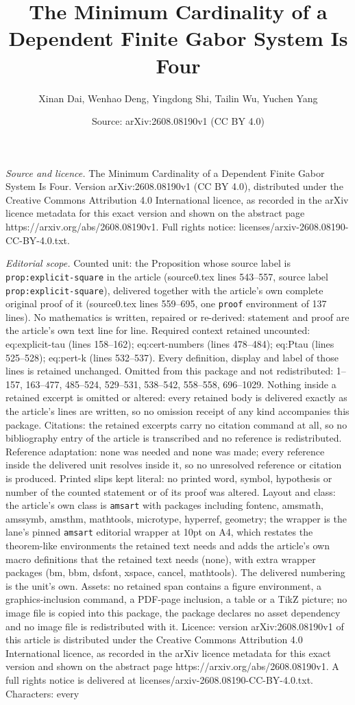 \documentclass[10pt,a4paper]{amsart}
\title[The Minimum Cardinality of a Dependent Finite Gabor System I]{The Minimum Cardinality of a Dependent Finite Gabor System Is Four}
\author{Xinan Dai, Wenhao Deng, Yingdong Shi, Tailin Wu, Yuchen Yang}
\date{Source: arXiv:2608.08190v1 (CC BY 4.0)}
\begin{document}
\maketitle

\noindent\emph{Source and licence.} The Minimum Cardinality of a Dependent Finite Gabor System Is Four. Version arXiv:2608.08190v1 (CC BY 4.0), distributed under the Creative Commons Attribution 4.0 International licence, as recorded in the arXiv licence metadata for this exact version and shown on the abstract page https://arxiv.org/abs/2608.08190v1. Full rights notice: licenses/arxiv-2608.08190-CC-BY-4.0.txt.\par\smallskip

\noindent\textit{Editorial scope.} Counted unit: the Proposition whose source label is \texttt{prop:explicit-square} in the article (source0.tex lines 543--557, source label \texttt{prop:explicit-square}), delivered together with the article's own complete original proof of it (source0.tex lines 559--695, one \texttt{proof} environment of 137 lines). No mathematics is written, repaired or re-derived: statement and proof are the article's own text line for line. Required context retained uncounted: eq:explicit-tau (lines 158--162); eq:cert-numbers (lines 478--484); eq:Ptau (lines 525--528); eq:pert-k (lines 532--537). Every definition, display and label of those lines is retained unchanged. Omitted from this package and not redistributed: 1--157, 163--477, 485--524, 529--531, 538--542, 558--558, 696--1029. Nothing inside a retained excerpt is omitted or altered: every retained body is delivered exactly as the article's lines are written, so no omission receipt of any kind accompanies this package. Citations: the retained excerpts carry no citation command at all, so no bibliography entry of the article is transcribed and no reference is redistributed. Reference adaptation: none was needed and none was made; every reference inside the delivered unit resolves inside it, so no unresolved reference or citation is produced. Printed slips kept literal: no printed word, symbol, hypothesis or number of the counted statement or of its proof was altered. Layout and class: the article's own class is \texttt{amsart} with packages including fontenc, amsmath, amssymb, amsthm, mathtools, microtype, hyperref, geometry; the wrapper is the lane's pinned \texttt{amsart} editorial wrapper at 10pt on A4, which restates the theorem-like environments the retained text needs and adds the article's own macro definitions that the retained text needs (none), with extra wrapper packages (bm, bbm, dsfont, xspace, cancel, mathtools). The delivered numbering is the unit's own. Assets: no retained span contains a figure environment, a graphics-inclusion command, a PDF-page inclusion, a table or a TikZ picture; no image file is copied into this package, the package declares no asset dependency and no image file is redistributed with it. Licence: version arXiv:2608.08190v1 of this article is distributed under the Creative Commons Attribution 4.0 International licence, as recorded in the arXiv licence metadata for this exact version and shown on the abstract page https://arxiv.org/abs/2608.08190v1. A full rights notice is delivered at licenses/arxiv-2608.08190-CC-BY-4.0.txt. Characters: every 
\end{document}
